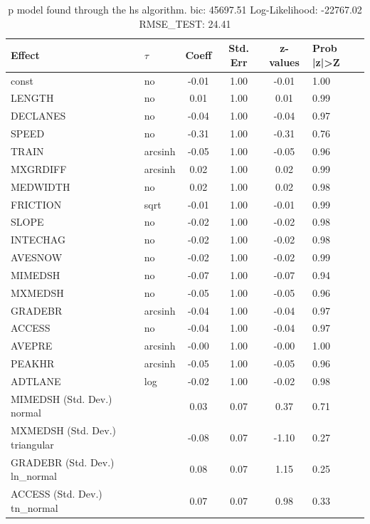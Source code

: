 \begin{table}
	\caption{p model found through the hs algorithm. bic: 45697.51 Log-Likelihood: -22767.02 RMSE_TEST: 24.41}
	\begin{center}
		\begin{tabular}{|l|l|c|c|c|l|}
			\hline
			Effect & $\tau$ & Coeff & Std. Err & z-values & Prob |z|>Z \\
			\hline
			const & no & -0.01 & 1.00 & -0.01 & 1.00 \\
			\hline
			LENGTH & no & 0.01 & 1.00 & 0.01 & 0.99 \\
			\hline
			DECLANES & no & -0.04 & 1.00 & -0.04 & 0.97 \\
			\hline
			SPEED & no & -0.31 & 1.00 & -0.31 & 0.76 \\
			\hline
			TRAIN & arcsinh & -0.05 & 1.00 & -0.05 & 0.96 \\
			\hline
			MXGRDIFF & arcsinh & 0.02 & 1.00 & 0.02 & 0.99 \\
			\hline
			MEDWIDTH & no & 0.02 & 1.00 & 0.02 & 0.98 \\
			\hline
			FRICTION & sqrt & -0.01 & 1.00 & -0.01 & 0.99 \\
			\hline
			SLOPE & no & -0.02 & 1.00 & -0.02 & 0.98 \\
			\hline
			INTECHAG & no & -0.02 & 1.00 & -0.02 & 0.98 \\
			\hline
			AVESNOW & no & -0.02 & 1.00 & -0.02 & 0.99 \\
			\hline
			MIMEDSH & no & -0.07 & 1.00 & -0.07 & 0.94 \\
			\hline
			MXMEDSH & no & -0.05 & 1.00 & -0.05 & 0.96 \\
			\hline
			GRADEBR & arcsinh & -0.04 & 1.00 & -0.04 & 0.97 \\
			\hline
			ACCESS & no & -0.04 & 1.00 & -0.04 & 0.97 \\
			\hline
			AVEPRE & arcsinh & -0.00 & 1.00 & -0.00 & 1.00 \\
			\hline
			PEAKHR & arcsinh & -0.05 & 1.00 & -0.05 & 0.96 \\
			\hline
			ADTLANE & log & -0.02 & 1.00 & -0.02 & 0.98 \\
			\hline
			MIMEDSH (Std. Dev.) normal &  & 0.03 & 0.07 & 0.37 & 0.71 \\
			\hline
			MXMEDSH (Std. Dev.) triangular &  & -0.08 & 0.07 & -1.10 & 0.27 \\
			\hline
			GRADEBR (Std. Dev.) ln_normal &  & 0.08 & 0.07 & 1.15 & 0.25 \\
			\hline
			ACCESS (Std. Dev.) tn_normal &  & 0.07 & 0.07 & 0.98 & 0.33 \\

\end{tabular}
\end{center}
\end{table}
